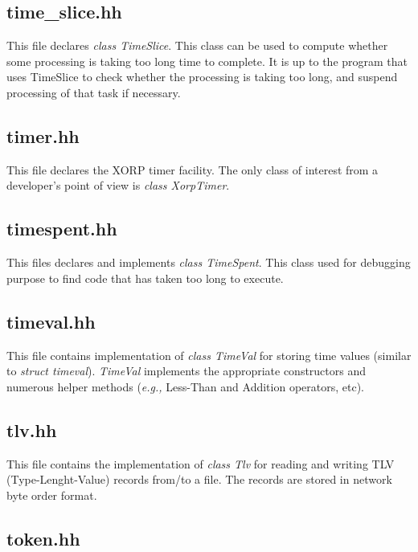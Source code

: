 \documentclass[11pt]{article}
\newcommand{\eg}{\emph{e.g.,}\xspace}
\begin{document}
\subsection{time\_slice.hh}

This file declares \emph{class TimeSlice}.
This class can be used to compute whether some processing is taking
too long time to complete. It is up to the program that uses
TimeSlice to check whether the processing is taking too long,
and suspend processing of that task if necessary.

\subsection{timer.hh}

This file declares the XORP timer facility. The only class of interest
from a developer's point of view is \emph{class XorpTimer}.

\subsection{timespent.hh}

This files declares and implements \emph{class TimeSpent}.
This class used for debugging purpose to find code that has taken too long to
execute.

\subsection{timeval.hh}

This file contains implementation of \emph{class TimeVal} for
storing time values (similar to \emph{struct timeval}).
\emph{TimeVal} implements the appropriate constructors and numerous
helper methods (\eg Less-Than and Addition operators, etc).

\subsection{tlv.hh}

This file contains the implementation of \emph{class Tlv} for reading
and writing TLV (Type-Lenght-Value) records from/to a file. The records
are stored in network byte order format.

\subsection{token.hh}
\end{document}
